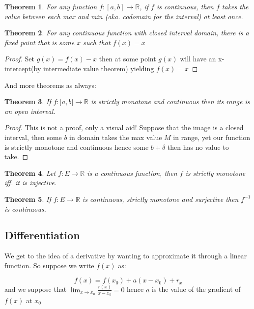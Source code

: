 \documentclass[titlepage]{article}
\newtheorem{theorem}{Theorem}[section]
\begin{document}
\begin{tcolorbox}[drop shadow, title = (Consequences of Bolzano-Weierstrass),lower separated=true]
\begin{theorem}
For any function $f: [a,b] \to \mathbb{R}$, if $f$ is continuous, then $f$ takes the value between each max and min (aka. codomain for the interval) at least once. 
\end{theorem}


\begin{theorem}
For any continuous function with closed interval domain, there is a fixed point that is some $x$ such that $f(x) = x$
\end{theorem}

\begin{proof}
Set $g(x) = f(x) - x$ then at some point $g(x)$ will have an x-intercept(by intermediate value theorem) yielding $f(x) = x$
\end{proof}
\end{tcolorbox}

And more theorems as always:

\begin{theorem}
If $f: ]a,b[ \to \mathbb{R}$ is strictly monotone and continuous then its range is an open interval.  
\end{theorem}

\begin{proof}
This is not a proof, only a visual aid! Suppose that the image is a closed interval, then some $b$ in domain takes the max value $M$ in range, yet our function is strictly monotone and continuous hence some $b+\delta$ then has no value to take. 
\end{proof}

\begin{theorem}
Let $f: E \to \mathbb{R}$ is a continuous function, then $f$ is strictly monotone iff. it is injective.  
\end{theorem}

\begin{theorem}
If $f: E \to \mathbb{R}$ is continuous, strictly monotone and surjective then $f^{-1}$ is continuous.
\end{theorem}

\subsection{Differentiation}

We get to the idea of a derivative by wanting to approximate it through a linear function. So suppose we write $f(x)$ as:

$$f(x) = f(x_{0}) + a(x-x_{0}) + r_{x}$$ and we suppose that $\lim_{x \to x_{0}}\frac{r(x)}{x-x_{0}} = 0$ hence $a$ is the value of the gradient of $f(x)$ at $x_{0}$
\end{document}
